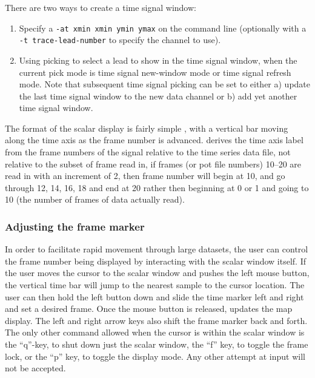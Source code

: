 There are two ways to create a time signal window:
%
\begin{enumerate}
  \item Specify a \texttt{-at xmin xmin ymin ymax} on the command line
        (optionally with a \texttt{-t trace-lead-number} to specify the
        channel to use).
  \item Using picking to select a lead to show in the time signal window,
        when the current pick mode is time signal new-window mode or
        time signal refresh mode.
        Note that subsequent time signal picking can be set to either a)
        update the last time signal window to the new data channel or b)
        add yet another time signal window.
\end{enumerate}
%

The format of the scalar display is fairly simple 
, with a vertical bar moving along the time axis as the frame number is
advanced.  \map{} derives the time axis label from the frame numbers of the
signal relative to the time series data file, not relative to the subset of
frame read in, \ie{} if frames (or pot file numbers) 10--20 are read in
with an increment of 2, then frame number will begin at 10, and go through
12, 14, 16, 18 and end at 20 rather then beginning at 0 or 1 and going to 10
(the number of frames of data actually read).


\subsubsection{Adjusting the frame marker}
\label{sec:control-frames} 

In order to facilitate rapid movement through large datasets, the user can
control the frame number being displayed by interacting with the scalar
window itself.  If the user moves the cursor to the scalar window and
pushes the left mouse button, the vertical time bar will jump to the
nearest sample to the cursor location.  The user can then hold the left
button down and slide the time marker left and right and set a desired
frame.  Once the mouse button is released,\map{} updates the map display.
The left and right arrow keys also shift the frame marker back and forth.
The only other command allowed when the cursor is within the scalar window
is the ``q''-key, to shut down just the scalar window, the ``f'' key,
to toggle the frame lock, or the ``p'' key, to toggle the display mode.
Any other attempt at input will not be accepted.


